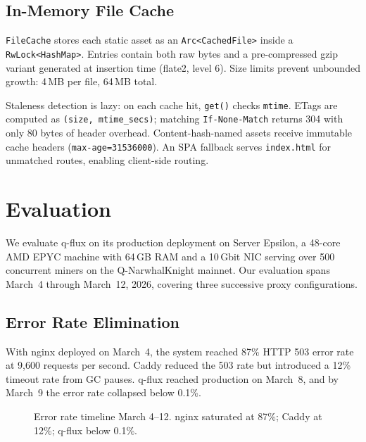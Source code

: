 \documentclass[a4paper, 11pt]{article}
\begin{document}
\subsection{In-Memory File Cache}
\label{sec:file-cache}

\texttt{FileCache} stores each static asset as an \texttt{Arc<CachedFile>}
inside a \texttt{RwLock<HashMap>}. Entries contain both raw bytes and a
pre-compressed gzip variant generated at insertion time (flate2, level 6).
Size limits prevent unbounded growth: 4\,MB per file, 64\,MB total.

Staleness detection is lazy: on each cache hit, \texttt{get()} checks
\texttt{mtime}. ETags are computed as \texttt{(size, mtime\_secs)};
matching \texttt{If-None-Match} returns 304 with only 80 bytes of header
overhead. Content-hash-named assets receive immutable cache headers
(\texttt{max-age=31536000}). An SPA fallback serves \texttt{index.html}
for unmatched routes, enabling client-side routing.
\section{Evaluation}
\label{sec:evaluation}

We evaluate q-flux on its production deployment on Server Epsilon, a 48-core AMD EPYC machine with 64\,GB RAM and a 10\,Gbit NIC serving over 500 concurrent miners on the Q-NarwhalKnight mainnet. Our evaluation spans March~4 through March~12, 2026, covering three successive proxy configurations.

\subsection{Error Rate Elimination}
\label{sec:eval-errors}

With nginx deployed on March~4, the system reached 87\% HTTP 503 error rate at 9{,}600 requests per second. Caddy reduced the 503 rate but introduced a 12\% timeout rate from GC pauses. q-flux reached production on March~8, and by March~9 the error rate collapsed below 0.1\%.

\begin{figure}[t]
\centering
{}
\caption{Error rate timeline March 4--12. nginx saturated at 87\%; Caddy at 12\%; q-flux below 0.1\%.}
\label{fig:error-timeline}
\end{figure}
\end{document}
